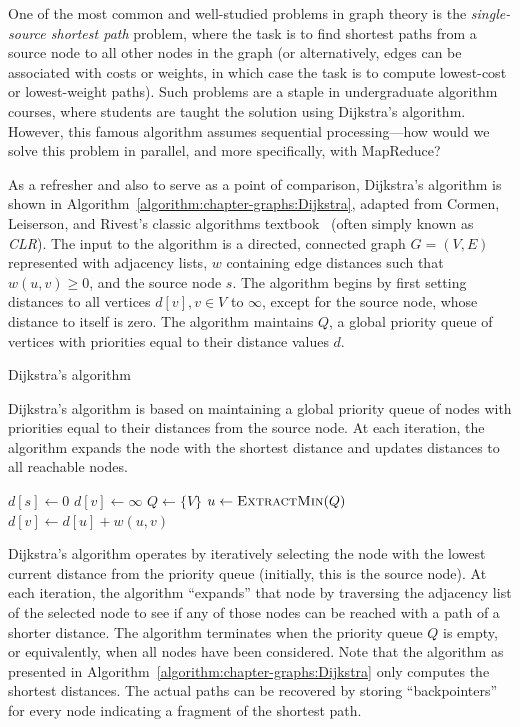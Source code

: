 One of the most common and well-studied problems in graph theory is
the \emph{single-source shortest path} problem, where the task is to
find shortest paths from a source node to all other nodes in the graph
(or alternatively, edges can be associated with costs or weights, in
which case the task is to compute lowest-cost or lowest-weight paths).
Such problems are a staple in undergraduate algorithm courses, where
students are taught the solution using Dijkstra's algorithm.  However,
this famous algorithm assumes sequential processing---how would we
solve this problem in parallel, and more specifically, with MapReduce?

As a refresher and also to serve as a point of comparison, Dijkstra's
algorithm is shown in Algorithm~\ref{algorithm:chapter-graphs:Dijkstra},
adapted from Cormen, Leiserson, and Rivest's classic algorithms
textbook~\cite{CLR} (often simply known as \emph{CLR}).  The input to
the algorithm is a directed, connected graph $G=(V,E)$ represented
with adjacency lists, $w$ containing edge distances such that $w(u,v)
\geq 0$, and the source node $s$.  The algorithm begins by first
setting distances to all vertices $d[v], v \in V$ to $\infty$, except
for the source node, whose distance to itself is zero.  The algorithm
maintains $Q$, a global priority queue of vertices with priorities equal to
their distance values $d$.

\begin{algorithm}[t]
\caption{Dijkstra's algorithm}
\label{algorithm:chapter-graphs:Dijkstra}
Dijkstra's algorithm is based on maintaining a global priority queue
of nodes with priorities equal to their distances from the source
node.  At each iteration, the algorithm expands the node with the
shortest distance and updates distances to all reachable nodes.

  \algrenewcommand\algorithmicfunction{}
  \begin{algorithmic}[1]
    \State $d[s] \gets 0$
      \State $d[v] \gets \infty$
    \EndFor
    \State $Q \gets \{V\}$
      \State $u \gets \textsc{ExtractMin}(Q)$
          \State $d[v] \gets d[u] + w(u,v)$
        \EndIf
      \EndFor
    \EndWhile
    \EndFunction
  \end{algorithmic}
\end{algorithm}

Dijkstra's algorithm operates by iteratively selecting the node with
the lowest current distance from the priority queue (initially, this
is the source node).  At each iteration, the algorithm ``expands''
that node by traversing the adjacency list of the selected node to see
if any of those nodes can be reached with a path of a shorter
distance.  The algorithm terminates when the priority queue $Q$ is
empty, or equivalently, when all nodes have been considered.  Note
that the algorithm as presented in
Algorithm~\ref{algorithm:chapter-graphs:Dijkstra} only computes the shortest
distances.  The actual paths can be recovered by storing
``backpointers'' for every node indicating a fragment of the shortest
path.

